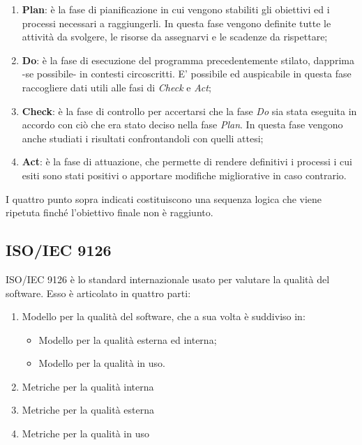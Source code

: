 \begin{enumerate}
	\item{\textbf{Plan}: è la fase di pianificazione in cui vengono stabiliti gli obiettivi ed i processi necessari a raggiungerli. In questa fase vengono definite tutte le attività da svolgere, le risorse da assegnarvi e le scadenze da rispettare;}
	\item{\textbf{Do}: è la fase di esecuzione del programma precedentemente stilato, dapprima -se possibile- in contesti circoscritti. E' possibile ed auspicabile in questa fase raccogliere dati utili alle fasi di \textit{Check} e \textit{Act};}
	\item{\textbf{Check}: è la fase di controllo per accertarsi che la fase \textit{Do} sia stata eseguita in accordo con ciò che era stato deciso nella fase \textit{Plan}. In questa fase vengono anche studiati i risultati confrontandoli con quelli attesi;}
	\item{\textbf{Act}: è la fase di attuazione, che permette di rendere definitivi i processi i cui esiti sono stati positivi o apportare modifiche migliorative in caso contrario.}
\end{enumerate}
I quattro punto sopra indicati costituiscono una sequenza logica che viene ripetuta finché l'obiettivo finale non è raggiunto.
\pagebreak

\subsection{ISO/IEC 9126}
ISO/IEC 9126 è lo standard internazionale usato per valutare la qualità del software. Esso è articolato in quattro parti:
\begin{enumerate}
	\item{Modello per la qualità del software, che a sua volta è suddiviso in:}
	\begin{itemize}
		\item{Modello per la qualità esterna ed interna;}
		\item{Modello per la qualità in uso.}
	\end{itemize}
	\item{Metriche per la qualità interna}
	\item{Metriche per la qualità esterna}
	\item{Metriche per la qualità in uso}
\end{enumerate}

